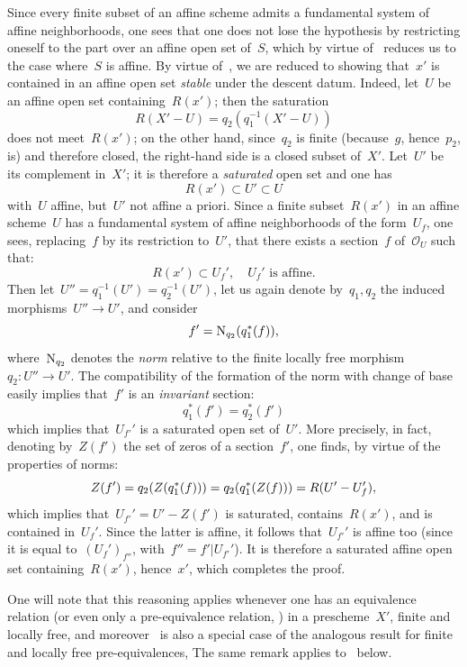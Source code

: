 Since every finite subset of an affine scheme admits a fundamental
system of affine neighborhoods, one sees that one does not lose
the hypothesis by restricting oneself to the part over an affine open set
of~$S$, which by virtue of~ reduces us to the case
where~$S$ is affine. By virtue of~, we are reduced
to showing
that~$x'$
is contained
in an affine open set \emph{stable} under the descent
datum. Indeed, let~$U$ be an affine open set containing~$R(x')$; then
the saturation
$$
R(X'-U)=q_{2}(q_{1}^{-1}(X'-U))
$$
does not meet~$R(x')$; on the other hand, since~$q_{2}$ is finite (because~$g$,
hence~$p_{2}$, is) and therefore closed, the right-hand side is a
closed subset of~$X'$. Let~$U'$ be its complement in~$X'$;
it is therefore a \emph{saturated} open set and one has
$$
R(x')\subset U'\subset U
$$
with~$U$ affine, but~$U'$ not affine a priori. Since a finite
subset~$R(x')$ in an affine scheme~$U$ has a fundamental
system of affine neighborhoods of the form~$U_{f}$, one sees,
replacing~$f$ by its restriction to~$U'$, that there exists a
section~$f$ of~$\mathcal{O}_{U}$ such that:
$$
R(x')\subset U_{f}',\quad U_{f}'\textrm{ is affine}.
$$
Then let~$U''=q_{1}^{-1}(U')=q_{2}^{-1}(U')$, let us again denote
by~$q_{1},q_{2}$ the induced morphisms~$U''\to U'$, and
consider
$$
f'=\operatorname{N}_{q_{2}}(q_{1}^*(f)),
$$
where~$\operatorname{N}_{q_{2}}$ denotes the \emph{norm} relative to the
finite locally free morphism~$q_{2}\colon U''\to U'$. The
compatibility of the formation of the norm with change
of base easily implies that~$f'$ is an \emph{invariant} section:
$$
q_{1}^*(f')=q_{2}^*(f')
$$
which implies that~$U_{f'}'$ is a saturated open set of~$U'$. More
precisely, in fact, denoting by~$Z(f')$
the set of zeros of a section~$f'$, one finds, by virtue of the
properties of norms:
$$
Z(f')=q_{2}(Z(q_{1}^*(f)))=q_{2}(q_{1}^*(Z(f)))=
R(U'-U_{f}'),
$$
which
implies that~$U_{f'}'=U'-Z(f')$ is saturated, contains~$R(x')$,
and is contained in~$U_{f}'$. Since the latter is affine, it follows
that~$U_{f'}'$ is affine too (since it is equal to~$(U_{f}')_{f''}$,
with~$f''=f'|U_{f'}'$). It is therefore a saturated affine open set
containing~$R(x')$, hence~$x'$, which completes the proof.

One will note that this reasoning applies whenever one has an
equivalence relation (or even only a pre-equivalence relation,
\cf \cite{VIII.3}) in a prescheme~$X'$, finite
and locally free, and moreover~ is also a special
case of the analogous result for finite and locally free
pre-equivalences, \cf \loccit The same remark
applies to~ below.


